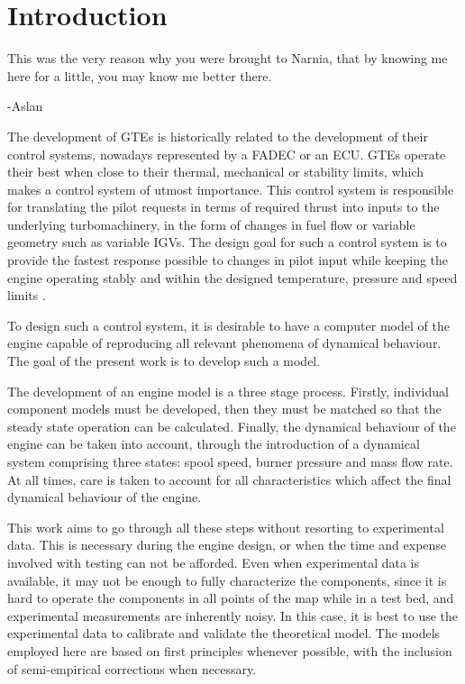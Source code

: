 \documentclass[tcc]{subfiles}
\begin{document}
\chapter{Introduction}
\label{ch:intro}
\epigraph{This was the very reason why you were brought to Narnia, that by knowing me here for a little, you may know me better there.}{-Aslan}

The development of \acp{GTE} is historically related to the development of their control systems, 
nowadays represented by a \ac{FADEC} or an \ac{ECU}. \Acp{GTE} operate their best when close to their
thermal, mechanical or stability limits, which makes a control system of utmost importance.
This control system is responsible for translating the pilot requests in terms of required thrust 
into inputs to the underlying turbomachinery, 
in the form of changes in fuel flow or variable geometry such as variable \acp{IGV}.
The design goal for such a control system is to provide the fastest response possible to changes in pilot input
while keeping the engine operating stably and within the designed temperature, pressure and speed limits
\cite{AustinSpangIII1999}.

To design such a control system, it is desirable to have a computer model of the engine 
capable of reproducing all relevant phenomena of dynamical behaviour. 
The goal of the present work is to develop such a model. 

The development of an engine model is a three stage process. 
Firstly, individual component models must be developed, 
then they must be matched so that the steady state operation can be calculated.
Finally, the dynamical behaviour of the engine can be taken into account, 
through the introduction of a dynamical system comprising three states: 
spool speed, burner pressure and mass flow rate. 
At all times, care is taken to account for all characteristics which affect the final dynamical behaviour of the engine.

This work aims to go through all these steps without resorting to experimental data.
This is necessary during the engine design, or when the time and expense involved with testing can not be afforded.
Even when experimental data is available, it may not be enough to fully characterize the components,
since it is hard to operate the components in all points of the map while in a test bed, 
and experimental measurements are inherently noisy. 
In this case, it is best to use the experimental data to calibrate and validate the theoretical model.
The models employed here are based on first principles whenever possible, 
with the inclusion of semi-empirical corrections when necessary. 
\end{document}
